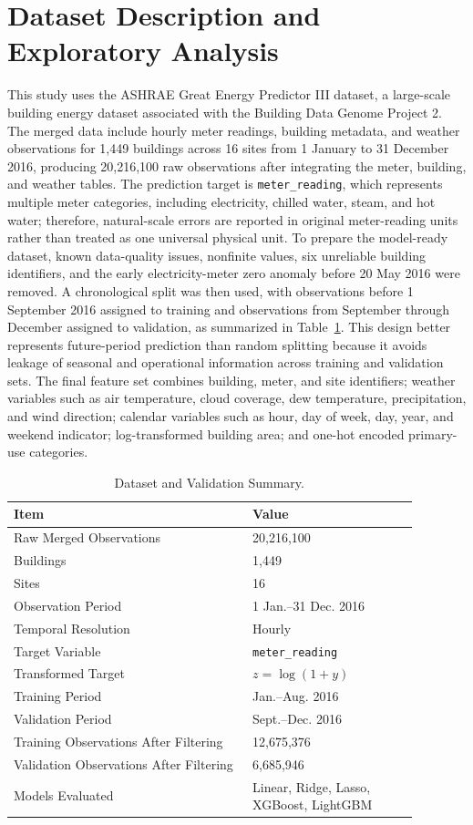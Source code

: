 \documentclass[conference]{IEEEtran}
\begin{document}
\section{Dataset Description and Exploratory Analysis}
This study uses the ASHRAE Great Energy Predictor III dataset, a large-scale building energy dataset associated with the Building Data Genome Project 2. The merged data include hourly meter readings, building metadata, and weather observations for 1,449 buildings across 16 sites from 1 January to 31 December 2016, producing 20,216,100 raw observations after integrating the meter, building, and weather tables. The prediction target is \texttt{meter\_reading}, which represents multiple meter categories, including electricity, chilled water, steam, and hot water; therefore, natural-scale errors are reported in original meter-reading units rather than treated as one universal physical unit. To prepare the model-ready dataset, known data-quality issues, nonfinite values, six unreliable building identifiers, and the early electricity-meter zero anomaly before 20 May 2016 were removed. A chronological split was then used, with observations before 1 September 2016 assigned to training and observations from September through December assigned to validation, as summarized in Table~\ref{tab:dataset_summary}. This design better represents future-period prediction than random splitting because it avoids leakage of seasonal and operational information across training and validation sets. The final feature set combines building, meter, and site identifiers; weather variables such as air temperature, cloud coverage, dew temperature, precipitation, and wind direction; calendar variables such as hour, day of week, day, year, and weekend indicator; log-transformed building area; and one-hot encoded primary-use categories.
\begin{table}[!t]
\centering
\caption{Dataset and Validation Summary.}
\label{tab:dataset_summary}
\begin{tabular}{p{0.52\linewidth}p{0.36\linewidth}}
\toprule
\textbf{Item} & \textbf{Value} \\
\midrule
Raw Merged Observations & 20,216,100 \\
Buildings & 1,449 \\
Sites & 16 \\
Observation Period & 1 Jan.--31 Dec. 2016 \\
Temporal Resolution & Hourly \\
Target Variable & \texttt{meter\_reading} \\
Transformed Target & $z=\log(1+y)$ \\
Training Period & Jan.--Aug. 2016 \\
Validation Period & Sept.--Dec. 2016 \\
Training Observations After Filtering & 12,675,376 \\
Validation Observations After Filtering & 6,685,946 \\
Models Evaluated & Linear, Ridge, Lasso, XGBoost, LightGBM \\
\bottomrule
\end{tabular}
\end{table}
\end{document}
